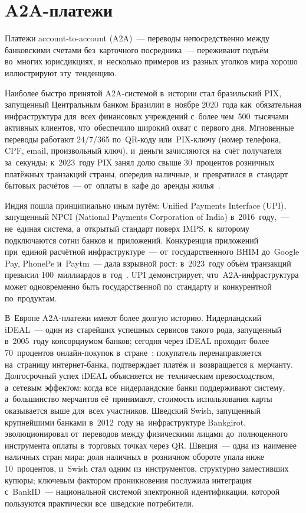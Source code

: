 \section{A2A-платежи}
\label{sec:a2a-payments}

Платежи account-to-account (A2A)~--- переводы непосредственно
между банковскими счетами без~карточного посредника~--- переживают
подъём во~многих юрисдикциях, и~несколько примеров из~разных уголков
мира хорошо иллюстрируют эту~тенденцию.

Наиболее быстро принятой A2A-системой в~истории стал бразильский PIX,
запущенный Центральным банком Бразилии в~ноябре 2020~года как~обязательная
инфраструктура для~всех финансовых учреждений с~более чем~500~тысячами
активных клиентов, что~обеспечило широкий охват с~первого дня.
Мгновенные переводы работают 24/7/365 по~QR-коду или~PIX-ключу
(номер телефона, CPF, email, произвольный ключ), и~деньги зачисляются
на~счёт получателя за~секунды; к~2023~году PIX занял долю свыше
30~процентов розничных платёжных транзакций страны, опередив наличные,
и~превратился в~стандарт бытовых расчётов~--- от~оплаты в~кафе
до~аренды жилья~.

Индия пошла принципиально иным путём: Unified Payments Interface (UPI),
запущенный NPCI (National Payments Corporation of India) в~2016~году,~---
не~единая система, а~открытый стандарт поверх IMPS, к~которому
подключаются сотни банков и~приложений. Конкуренция приложений при~единой
расчётной инфраструктуре~--- от~государственного BHIM до~Google Pay,
PhonePe и~Paytm~--- дала взрывной рост: в~2023~году объём транзакций
превысил 100~миллиардов в~год~.
UPI демонстрирует, что~A2A-инфраструктура может одновременно быть
государственной по~стандарту и~конкурентной по~продуктам.

В~Европе A2A-платежи имеют более долгую историю. Нидерландский iDEAL~---
один из~старейших успешных сервисов такого рода, запущенный в~2005~году
консорциумом банков; сегодня через iDEAL проходит более 70~процентов
онлайн-покупок в~стране~:
покупатель перенаправляется на~страницу интернет-банка, подтверждает
платёж и~возвращается к~мерчанту. Долгосрочный успех iDEAL объясняется
не~техническим превосходством, а~сетевым эффектом: когда все~нидерландские
банки поддерживают систему, а~большинство мерчантов её~принимают,
стоимость использования карты оказывается выше для~всех участников.
Шведский Swish, запущенный крупнейшими банками в~2012~году на~инфраструктуре
Bankgirot, эволюционировал от~переводов между физическими лицами
до~полноценного инструмента оплаты в~торговых точках через QR.
Швеция~--- одна из~наименее наличных стран мира: доля наличных
в~розничном обороте упала ниже 10~процентов, и~Swish стал одним
из~инструментов, структурно заместивших купюры; ключевым фактором
проникновения послужила интеграция с~BankID~--- национальной системой
электронной идентификации, которой пользуются практически все~шведские
потребители.

